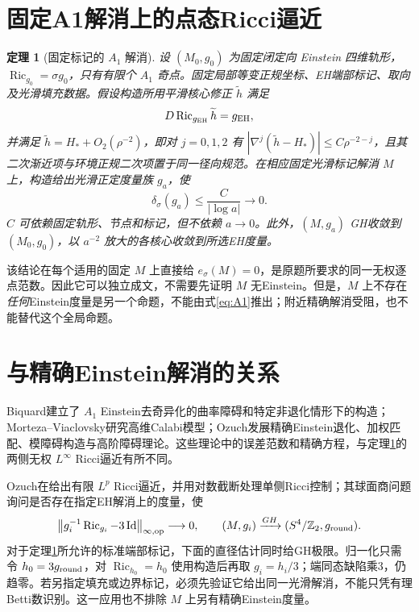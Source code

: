 \documentclass[UTF8,a4paper,11pt,fontset=fandol]{ctexart}
\numberwithin{equation}{section}
\newtheorem{theorem}{定理}[section]
\theoremstyle{definition}
\newcommand{\Ric}{\operatorname{Ric}}
\newcommand{\Id}{\operatorname{Id}}
\newcommand{\op}{\mathrm{op}}
\newcommand{\Z}{\mathbb Z}
\newcommand{\norm}[1]{\left\lVert#1\right\rVert}
\begin{document}
\section{固定A1解消上的点态Ricci逼近}
\begin{theorem}[固定标记的 $A_1$ 解消]\label{thm:A1}
设 $(M_0,g_0)$ 为固定闭定向 Einstein 四维轨形，$\Ric_{g_0}=\sigma g_0$，只有有限个 $A_1$ 奇点。固定局部等变正规坐标、EH端部标记、取向及光滑填充数据。假设构造所用平滑核心修正 $\widetilde h$ 满足
\[
D\Ric_{g_{\rm EH}}\widetilde h=g_{\rm EH},
\]
并满足 $\widetilde h=H_*+O_2(\rho^{-2})$，即对 $j=0,1,2$ 有
$|\nabla^j(\widetilde h-H_*)|\le C\rho^{-2-j}$，且其二次渐近项与环境正规二次项置于同一径向规范。在相应固定光滑标记解消 $M$ 上，构造给出光滑正定度量族 $g_a$，使
\begin{equation}\label{eq:A1}
\delta_\sigma(g_a)\le\frac{C}{|\log a|}\longrightarrow0.
\end{equation}
$C$ 可依赖固定轨形、节点和标记，但不依赖 $a\to0$。此外，$(M,g_a)$ GH收敛到 $(M_0,g_0)$，以 $a^{-2}$ 放大的各核心收敛到所选EH度量。
\end{theorem}

该结论在每个适用的固定 $M$ 上直接给 $e_\sigma(M)=0$，是原题所要求的同一无权逐点范数。因此它可以独立成文，不需要先证明 $M$ 无Einstein。但是，$M$ 上不存在\emph{任何}Einstein度量是另一个命题，不能由式\eqref{eq:A1}推出；附近精确解消受阻，也不能替代这个全局命题。

\section{与精确Einstein解消的关系}
Biquard建立了 $A_1$ Einstein去奇异化的曲率障碍和特定非退化情形下的构造；Morteza--Viaclovsky研究高维Calabi模型；Ozuch发展精确Einstein退化、加权匹配、模障碍构造与高阶障碍理论\cite{Biquard,MV,OzuchI,OzuchII,OzuchHigher,OzuchIntegrability}。这些理论中的误差范数和精确方程，与定理\ref{thm:A1}的两侧无权 $L^\infty$ Ricci逼近有所不同。

Ozuch在\cite[\S7.3]{OzuchII}给出有限 $L^p$ Ricci逼近，并用对数截断处理单侧Ricci控制；其球面商问题询问是否存在指定EH解消上的度量，使
\begin{equation}\label{eq:football}
\norm{g_i^{-1}\Ric_{g_i}-3\Id}_{\infty,\op}\longrightarrow0,
\qquad (M,g_i)\xrightarrow{GH}(S^4/\Z_2,g_{\rm round}).
\end{equation}
对于定理\ref{thm:A1}所允许的标准端部标记，下面的直径估计同时给GH极限。归一化只需令 $h_0=3g_{\rm round}$，对 $\Ric_{h_0}=h_0$ 使用构造后再取 $g_i=h_i/3$；端同态缺陷乘3，仍趋零。若另指定填充或边界标记，必须先验证它给出同一光滑解消，不能只凭有理Betti数识别。这一应用也不排除 $M$ 上另有精确Einstein度量。
\end{document}
